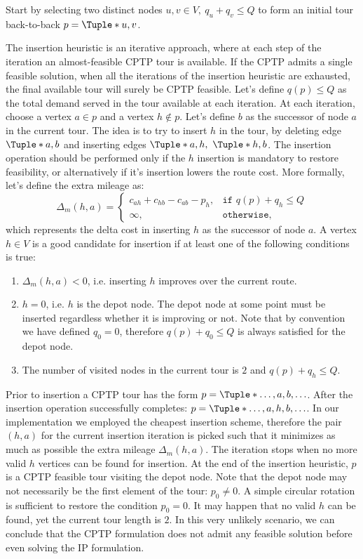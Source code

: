 \medskip

Start by selecting two distinct nodes $u, v \in V,\ q_u + q_v \le Q$
to form an initial tour back-to-back $p = \Tuple*{u, v}$.

The insertion heuristic is an iterative approach,
where at each step of the iteration
an almost-feasible CPTP tour is available.
If the CPTP admits a single feasible solution,
when all the iterations of the insertion heuristic are exhausted,
the final available tour will surely be CPTP feasible.
Let's define $q(p) \le Q$ as the total demand served
in the tour available at each iteration.
At each iteration,
choose a vertex $a \in p$ and a vertex $h \notin p$.
Let's define $b$ as the successor of node $a$ in the current tour.
The idea is to try to insert $h$ in the tour,
by deleting edge $\Tuple*{a, b}$
and inserting edges $\Tuple*{a, h},\ \Tuple*{h, b}$.
The insertion operation should be performed only
if the $h$ insertion is mandatory to restore feasibility,
or alternatively if it's insertion lowers the route cost.
More formally, let's define the extra mileage as:
\begin{equation}
	\Delta_m(h, a) =
	\begin{cases}
		c_{ah} + c_{hb} - c_{ab} - p_h, & \texttt{if } q(p) + q_h \le Q \\
		\infty,                         & \texttt{otherwise},
	\end{cases}
\end{equation}
which represents the delta cost in inserting $h$ as the successor of node $a$.
A vertex $h \in V$ is a good candidate for insertion
if at least one of the following conditions is true:
\begin{enumerate}
	\item $\Delta_m(h, a) < 0$, i.e. inserting $h$ improves over the current route.
	\item $h = 0$, i.e. $h$ is the depot node. The depot node at some point must be inserted regardless whether it is improving or not.
	      Note that by convention we have defined $q_0 = 0$, therefore $q(p) + q_0 \le Q$ is always satisfied for the depot node.
	\item The number of visited nodes in the current tour is $2$ and $q(p) + q_h \le Q$.
\end{enumerate}

Prior to insertion a CPTP tour has the form $p = \Tuple*{\dots, a, b, \dots}$.
After the insertion operation successfully completes: $p = \Tuple*{\dots, a, h, b, \dots}$.
In our implementation we employed the cheapest insertion scheme, therefore the pair $(h, a)$ for the current insertion iteration is picked such that it minimizes as much as possible the extra mileage $\Delta_m(h, a)$.
The iteration stops when no more valid $h$ vertices can be found for insertion.
At the end of the insertion heuristic, $p$ is a CPTP feasible tour visiting the depot node.
Note that the depot node may not necessarily be the first element of the tour: $p_0 \ne 0$.
A simple circular rotation is sufficient to restore the condition $p_0 = 0$.
It may happen that no valid $h$ can be found,
yet the current tour length is $2$.
In this very unlikely scenario,
we can conclude that the CPTP formulation does not admit any feasible solution
before even solving the IP formulation.

